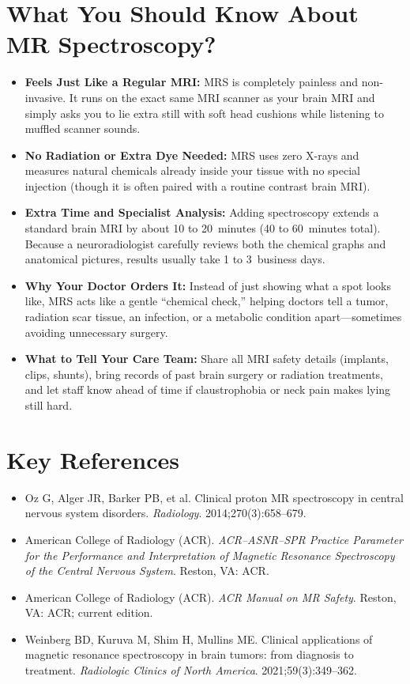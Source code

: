 \section{What You Should Know About MR Spectroscopy?}
\begin{itemize}
\item \textbf{Feels Just Like a Regular MRI:} MRS is completely painless and non-invasive. It runs on the exact same MRI scanner as your brain MRI and simply asks you to lie extra still with soft head cushions while listening to muffled scanner sounds.
\item \textbf{No Radiation or Extra Dye Needed:} MRS uses zero X-rays and measures natural chemicals already inside your tissue with no special injection (though it is often paired with a routine contrast brain MRI).
\item \textbf{Extra Time and Specialist Analysis:} Adding spectroscopy extends a standard brain MRI by about 10 to 20~minutes (40 to 60~minutes total). Because a neuroradiologist carefully reviews both the chemical graphs and anatomical pictures, results usually take 1 to 3~business days.
\item \textbf{Why Your Doctor Orders It:} Instead of just showing what a spot looks like, MRS acts like a gentle ``chemical check,'' helping doctors tell a tumor, radiation scar tissue, an infection, or a metabolic condition apart---sometimes avoiding unnecessary surgery.
\item \textbf{What to Tell Your Care Team:} Share all MRI safety details (implants, clips, shunts), bring records of past brain surgery or radiation treatments, and let staff know ahead of time if claustrophobia or neck pain makes lying still hard.
\end{itemize}

\section{Key References}
\begin{itemize}
\item Oz G, Alger JR, Barker PB, et al. Clinical proton MR spectroscopy in central nervous system disorders. \textit{Radiology}. 2014;270(3):658--679.
\item American College of Radiology (ACR). \textit{ACR--ASNR--SPR Practice Parameter for the Performance and Interpretation of Magnetic Resonance Spectroscopy of the Central Nervous System}. Reston, VA: ACR.
\item American College of Radiology (ACR). \textit{ACR Manual on MR Safety}. Reston, VA: ACR; current edition.
\item Weinberg BD, Kuruva M, Shim H, Mullins ME. Clinical applications of magnetic resonance spectroscopy in brain tumors: from diagnosis to treatment. \textit{Radiologic Clinics of North America}. 2021;59(3):349--362.
\end{itemize}
